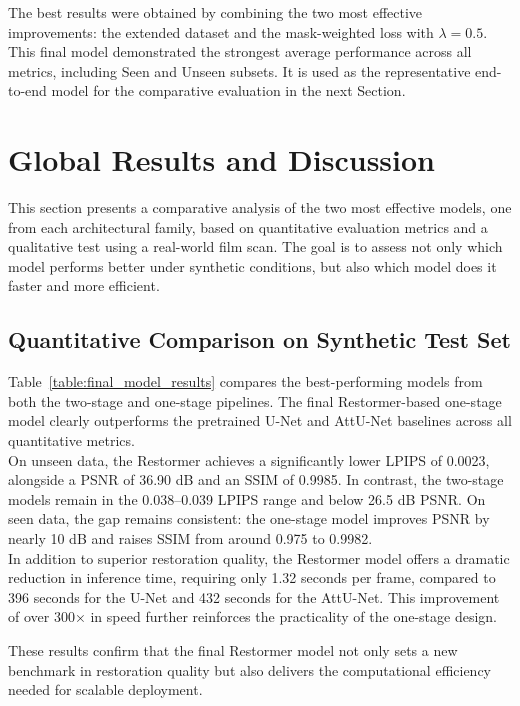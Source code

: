 \documentclass[10pt,a4paper,twocolumn,twoside]{article}
\begin{document}
The best results were obtained by combining the two most effective improvements: the extended dataset and the mask-weighted loss with $\lambda = 0.5$. This final model demonstrated the strongest average performance across all metrics, including Seen and Unseen subsets. It is used as the representative end-to-end model for the comparative evaluation in the next Section.

\section{Global Results and Discussion}
 This section presents a comparative analysis of the two most effective models, one from each architectural family, based on quantitative evaluation metrics and a qualitative test using a real-world film scan. The goal is to assess not only which model performs better under synthetic conditions, but also which model does it faster and more efficient.
\subsection{Quantitative Comparison on Synthetic Test Set}
Table~\ref{table:final_model_results} compares the best-performing models from both the two-stage and one-stage pipelines. The final Restormer-based one-stage model clearly outperforms the pretrained U-Net and AttU-Net baselines across all quantitative metrics. \\
On unseen data, the Restormer achieves a significantly lower LPIPS of 0.0023, alongside a PSNR of 36.90 dB and an SSIM of 0.9985. In contrast, the two-stage models remain in the 0.038–0.039 LPIPS range and below 26.5 dB PSNR. On seen data, the gap remains consistent: the one-stage model improves PSNR by nearly 10 dB and raises SSIM from around 0.975 to 0.9982. \\
In addition to superior restoration quality, the Restormer model offers a dramatic reduction in inference time, requiring only 1.32 seconds per frame, compared to 396 seconds for the U-Net and 432 seconds for the AttU-Net. This improvement of over 300× in speed further reinforces the practicality of the one-stage design.

These results confirm that the final Restormer model not only sets a new benchmark in restoration quality but also delivers the computational efficiency needed for scalable deployment.
\end{document}
